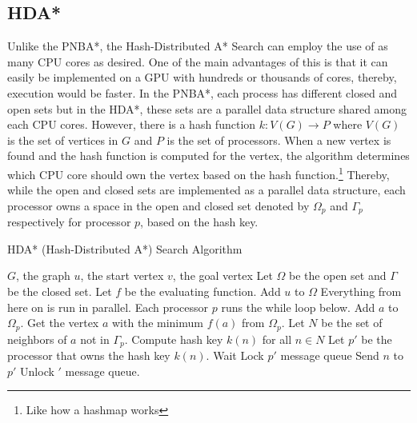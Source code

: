 \subsection{HDA*}
Unlike the PNBA*, the Hash-Distributed A* Search can employ the use of as many CPU cores as desired.\cite{Kishimoto2009} One 
of the main advantages of this is that it can easily be implemented on a GPU with hundreds or thousands of cores, thereby, 
execution would be faster. In the PNBA*, each process has different closed and open sets but in the HDA*, 
these sets are a parallel data structure shared among each CPU cores. However, there is a hash function $k:V(G)\to P$ where 
$V(G)$ is the set of vertices in $G$ and $P$ is the set of processors. When a new vertex is found and the hash function is computed for 
the vertex, the algorithm determines which CPU core should own the vertex based on the hash function.\footnote{Like how a hashmap works}
Thereby, while the open and closed sets are implemented as a parallel data structure, each processor owns a space 
in the open and closed set denoted by $\Omega_p$ and $\Gamma_p$ respectively for processor $p$, based on the hash key.

\begin{algorithm}[hb]
    \caption{HDA* (Hash-Distributed A*) Search Algorithm}
    \begin{algorithmic}
        \REQUIRE $G$, the graph 
        \REQUIRE $u$, the start vertex 
        \REQUIRE $v$, the goal vertex
        \STATE Let $\Omega$ be the open set and $\Gamma$ be the closed set. Let $f$ be the evaluating function.
        \STATE Add $u$ to $\Omega$
        \STATE Everything from here on is run in parallel. Each processor $p$ runs the while loop below.
                    \STATE Add $a$ to $\Omega_p$.
                \ENDIF
            \ELSE
                \STATE Get the vertex $a$ with the minimum $f(a)$ from $\Omega_p$.
                \STATE Let $N$ be the set of neighbors of $a$ not in $\Gamma_p$.
                \STATE Compute hash key $k(n)$ for all $n\in N$
                \STATE Let $p'$ be the processor that owns the hash key $k(n)$.
                    \STATE Wait
                \ENDWHILE
                \STATE Lock $p'$ message queue
                \STATE Send $n$ to $p'$
                \STATE Unlock $'$ message queue.       
            \ENDIF
        \ENDWHILE
    \end{algorithmic}
\end{algorithm}


